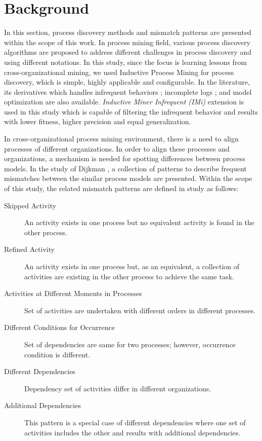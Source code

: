 \section{Background}
\label{sec:background}

In this section, process discovery methods and mismatch patterns are presented within the scope of this work. In process mining field, various process discovery algorithms are proposed to address different challenges in process discovery and using different notations. In this study, since the focus is learning lessons from cross-organizational mining, we used Inductive Process Mining \cite{leemans2013discovering} for process discovery, which is simple, highly applicable and configurable. In the literature, its derivatives which handles infrequent behaviors \cite{leemans2014discoveringinfrequent}; incomplete logs \cite{leemans2014discoveringincomplete}; and model optimization \cite{weidlich2012profiles} are also available. \textit{Inductive Miner Infrequent (IMi)} \cite{leemans2014discoveringinfrequent} extension is used in this study which is capable of filtering the infrequent behavior and results with lower fitness, higher precision and equal generalization.

In cross-organizational process mining environment, there is a need to align processes of different organizations. In order to align these processes and organizations, a mechanism is needed for spotting differences between process models. In the study of Dijkman \cite{dijkman2007mismatch}, a collection of patterns to describe frequent mismatches between the similar process models are presented. Within the scope of this study, the related mismatch patterns are defined in study \cite{dijkman2007mismatch} as follows:
\begin{description}
  \item[Skipped Activity] An activity exists in one process but no equivalent activity is found in the other process.
  \item[Refined Activity] An activity exists in one process but, as an equivalent, a collection of activities are existing in the other process to achieve the same task.
  \item[Activities at Different Moments in Processes] Set of activities are undertaken with different orders in different processes.
  \item[Different Conditions for Occurrence] Set of dependencies are same for two processes; however, occurrence condition is different.
  \item[Different Dependencies] Dependency set of activities differ in different organizations.
  \item[Additional Dependencies] This pattern is a special case of different dependencies where one set of activities includes the other and results with additional dependencies.
\end{description}

